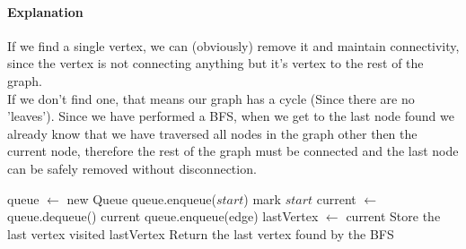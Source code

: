 \documentclass[12pt]{article}
\begin{document}
\paragraph{Explanation}
If we find a single vertex, we can (obviously) remove it and maintain connectivity, since the vertex is not connecting anything but it's vertex to the rest of the graph. \\
If we don't find one, that means our graph has a cycle (Since there are no 'leaves'). Since we have performed a BFS, when we get to the last node found we already know that we have traversed all nodes in the graph other then the current node, therefore the rest of the graph must be connected and the last node can be safely removed without disconnection.
\begin{algorithm}
\begin{algorithmic}[1]
		\State queue $\gets$ new Queue
		\State queue.enqueue($start$)
		\State mark $start$
			\State current $\gets$ queue.dequeue()
				\State \Return current
			\EndIf
					\State queue.enqueue(edge)
				\EndIf
			\EndFor
			\State lastVertex $\gets$ current
			\Comment Store the last vertex visited
		\EndWhile
		\State \Return lastVertex
		\Comment Return the last vertex found by the BFS
	\EndFunction
\end{algorithmic}
\end{algorithm}
\end{document}
